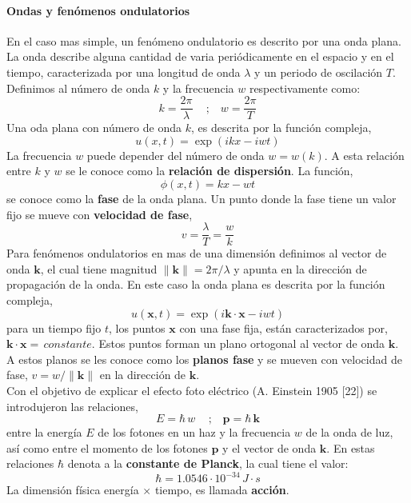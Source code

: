\documentclass[12pt]{book}
\numberwithin{equation}{chapter}
\def\x{\mathbf{x}}
\def\k{\mathbf{k}}
\def\P{\mathbf{p}}
\begin{document}
\paragraph{Ondas y fen\'omenos ondulatorios}
En el caso mas simple, un fen\'omeno ondulatorio es descrito por una onda plana. La onda describe alguna cantidad de varia peri\'odicamente en el espacio y en el tiempo, caracterizada por una longitud de onda $\lambda$ y un periodo de oscilaci\'on $T$. Definimos al n\'umero de onda $k$ y la frecuencia $w$ respectivamente como:
\begin{equation}
k= \frac{2 \pi}{\lambda} \,\,\,\,\,\,\,;\,\,\,\,\, w= \frac{2 \pi}{T}
\end{equation}
Una oda plana con n\'umero de onda $k$, es descrita por la funci\'on compleja,
\begin{equation}
u(x,t)= \exp ( ikx - iwt )
\end{equation}
La frecuencia $w$ puede depender del n\'umero de onda $w=w(k)$. A esta relaci\'on entre $k$ y $w$ se le conoce como la {\bf relaci\'on de dispersi\'on}. La funci\'on,
\begin{equation}
\phi (x,t)= kx - wt
\end{equation}
se conoce como la {\bf fase} de la onda plana. Un punto donde la fase tiene un valor fijo se mueve con {\bf velocidad de fase},
\begin{equation}
v= \frac{\lambda}{T}= \frac{w}{k}
\end{equation}
Para fen\'omenos ondulatorios en mas de una dimensi\'on definimos al vector de onda $\k$, el cual tiene magnitud $\| \k \|= 2\pi / \lambda$ y apunta en la direcci\'on de propagaci\'on de la onda. En este caso la onda plana es descrita por la funci\'on compleja,
\begin{equation}
u(\x,t)= \exp ( i \k \cdot \x - iwt )
\end{equation}
para un tiempo fijo $t$, los puntos $\x$ con una fase fija, est\'an caracterizados por, $ \k \cdot \x =\, constante $. Estos puntos forman un plano ortogonal al vector de onda $\k$. A estos planos se les conoce como los {\bf planos fase} y se mueven con velocidad de fase, $v= w/\| \k \|$ en la direcci\'on de $\k$.\\

Con el objetivo de explicar el efecto foto el\'ectrico (A. Einstein 1905 [22]) se introdujeron las relaciones, 
\begin{equation}\label{E-rel}
E= \hbar \, w \,\,\,\,\,\,\,;\,\,\,\,\, \P= \hbar \, \k
\end{equation}
entre la energ\'ia $E$ de los fotones en un haz y la frecuencia $w$ de la onda de luz, as\'i como entre el momento de los fotones $\P$ y el vector de onda $\k$. En estas relaciones $\hbar$ denota a la {\bf constante de Planck}, la cual tiene el valor:
\begin{equation}
\hbar= 1.0546 \cdot 10^{-34} \, J \cdot s
\end{equation}
La dimensi\'on f\'isica energ\'ia $\times$ tiempo, es llamada {\bf acci\'on}.  
\end{document}
